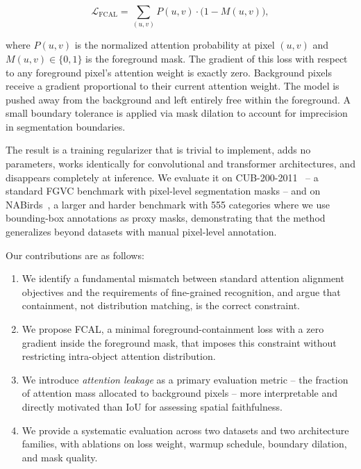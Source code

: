 \documentclass[journal]{IEEEtran}
\begin{document}
\begin{equation}
  \mathcal{L}_{\mathrm{FCAL}}
    = \sum_{(u,v)} P(u,v) \cdot \bigl(1 - M(u,v)\bigr),
  \label{eq:fcal_intro}
\end{equation}

where $P(u,v)$ is the normalized attention probability at pixel
$(u,v)$ and $M(u,v) \in \{0,1\}$ is the foreground mask.
The gradient of this loss with respect to any foreground
pixel's attention weight is exactly zero. Background pixels receive
a gradient proportional to their current attention weight. The
model is pushed away from the background and left entirely free
within the foreground. A small boundary tolerance is applied
via mask dilation to account for imprecision in segmentation
boundaries.

The result is a training regularizer that is trivial to implement,
adds no parameters, works identically for convolutional and
transformer architectures, and disappears completely at inference.
We evaluate it on CUB-200-2011~\cite{WahCUB_200_2011} -- a standard
FGVC benchmark with pixel-level segmentation masks -- and on
NABirds~\cite{vanhorn2015building}, a larger and harder benchmark
with 555 categories where we use bounding-box annotations as
proxy masks, demonstrating that the method generalizes beyond
datasets with manual pixel-level annotation.

Our contributions are as follows:

\begin{enumerate}
  \item We identify a fundamental mismatch between standard
        attention alignment objectives and the requirements of
        fine-grained recognition, and argue that containment,
        not distribution matching, is the correct constraint.

  \item We propose FCAL, a minimal foreground-containment loss
        with a zero gradient inside the foreground mask, that
        imposes this constraint without restricting intra-object
        attention distribution.

  \item We introduce \emph{attention leakage} as a primary
        evaluation metric -- the fraction of attention mass
        allocated to background pixels -- more interpretable and
        directly motivated than IoU for assessing spatial
        faithfulness.

  \item We provide a systematic evaluation across two datasets
        and two architecture families, with ablations on loss
        weight, warmup schedule, boundary dilation, and mask
        quality.
\end{enumerate}
\end{document}
